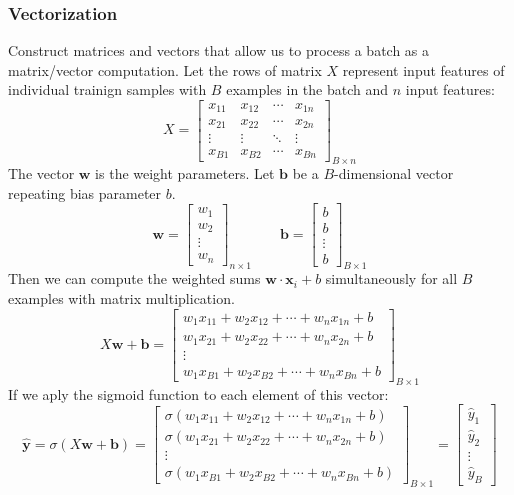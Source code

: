 \documentclass[11pt]{article}
\begin{document}
\subsubsection{Vectorization}
Construct matrices and vectors that allow us to process a batch as a matrix/vector computation.
Let the rows of matrix $X$ represent input features of individual trainign samples with $B$ examples in the batch and $n$ input features:
$$
X=\begin{bmatrix}
    x_{11} & x_{12} & \cdots & x_{1n} \\
    x_{21} & x_{22} & \cdots & x_{2n} \\
    \vdots & \vdots & \ddots & \vdots \\
    x_{B1} & x_{B2} & \cdots & x_{Bn}
\end{bmatrix}_{B\times n}
$$
The vector $\mathbf{w}$ is the weight parameters. Let $\mathbf{b}$ be a $B$-dimensional vector repeating bias parameter $b$.
$$
\mathbf{w}=\begin{bmatrix}
    w_1 \\
    w_2 \\
    \vdots \\
    w_n 
\end{bmatrix}_{n\times 1}
\quad\quad
\mathbf{b}=\begin{bmatrix}
    b \\
    b \\
    \vdots \\
    b
\end{bmatrix}_{B\times 1}
$$
Then we can compute the weighted sums $\mathbf{w}\cdot\mathbf{x}_i+b$ simultaneously for all $B$ examples with matrix multiplication.
$$
X\mathbf{w}+\mathbf{b}=\begin{bmatrix}
    w_1x_{11}+w_2x_{12}+\cdots+w_nx_{1n}+b \\
    w_1x_{21}+w_2x_{22}+\cdots+w_nx_{2n}+b \\
    \vdots \\
    w_1x_{B1}+w_2x_{B2}+\cdots+w_nx_{Bn}+b
\end{bmatrix}_{B\times 1}
$$
If we aply the sigmoid function to each element of this vector:
$$
\hat{\mathbf{y}}=\sigma(X\mathbf{w}+\mathbf{b})=\begin{bmatrix}
    \sigma(w_1x_{11}+w_2x_{12}+\cdots+w_nx_{1n}+b) \\
    \sigma(w_1x_{21}+w_2x_{22}+\cdots+w_nx_{2n}+b) \\
    \vdots \\
    \sigma(w_1x_{B1}+w_2x_{B2}+\cdots+w_nx_{Bn}+b)
\end{bmatrix}_{B\times 1}
=\begin{bmatrix}
    \hat{y}_1 \\
    \hat{y}_2 \\
    \vdots \\
    \hat{y}_B
\end{bmatrix}
$$
\end{document}
